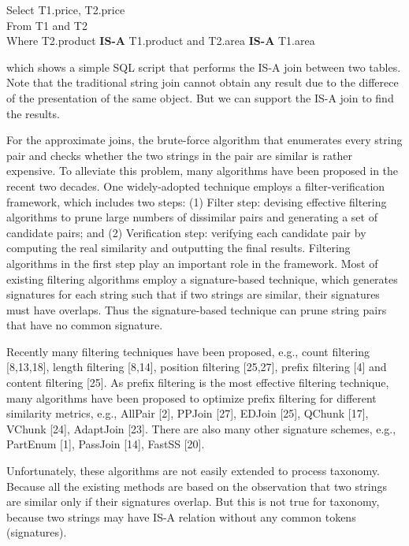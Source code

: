 \vspace{2mm}

\noindent \textsf{Select T1.price, T2.price} \\
\noindent \textsf{ From T1 and T2} \\
\noindent   \textsf{Where T2.product \textbf{IS-A} T1.product and T2.area \textbf{IS-A} T1.area}

 \vspace{2mm}


\noindent which shows a simple SQL script that
performs the IS-A join between two tables. Note that the traditional string join cannot obtain any result due to the differece of the presentation of the same object.  But we can support the IS-A join to find the results.

For the approximate joins, the brute-force algorithm that enumerates every string pair and checks whether the two strings in the pair are similar is rather expensive. To alleviate this problem, many algorithms have been proposed in the recent two decades. One widely-adopted technique employs a filter-verification framework, which includes two steps: (1) Filter step: devising effective filtering algorithms to prune large numbers of dissimilar pairs and generating a set of candidate pairs; and (2) Verification step: verifying each candidate pair by computing
the real similarity and outputting the final results. Filtering algorithms in the first step play an important role
in the framework. Most of existing filtering algorithms employ a signature-based technique, which generates signatures for each string such that if two strings are similar, their signatures must have overlaps. Thus the signature-based technique can prune string pairs that have no common signature.

Recently many filtering techniques have been proposed, e.g., count filtering [8,13,18], length filtering [8,14], position
filtering [25,27], prefix filtering [4] and content filtering [25]. As prefix filtering is the most effective filtering technique,
many algorithms have been proposed to optimize prefix filtering for different similarity metrics, e.g., AllPair [2],
PPJoin [27], EDJoin [25], QChunk [17], VChunk [24], AdaptJoin [23]. There are also many other signature schemes, e.g., PartEnum [1],
PassJoin [14], FastSS [20].

Unfortunately, these algorithms are not easily extended to process taxonomy. Because all the existing methods are based on the observation that two strings are similar only if their signatures overlap. But this is not true for taxonomy, because two strings may have IS-A relation without any common tokens (signatures).

